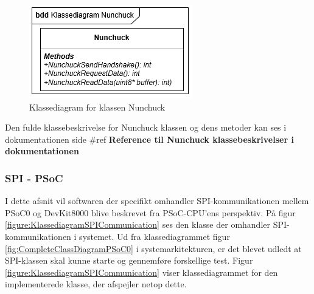 \begin{figure}[H]
	\centering
	\includegraphics[]{DesignOgImplementering/images/nunchuck}
	\caption{Klassediagram for klassen Nunchuck}
	\label{figure:NunchuckKlassediagram}
\end{figure}

Den fulde klassebeskrivelse for Nunchuck klassen og dens metoder kan ses i dokumentationen side \#ref \textbf{Reference til Nunchuck klassebeskrivelser i dokumentationen} 

\subsubsection{SPI - PSoC}
I dette afsnit vil softwaren der specifikt omhandler SPI-kommunikationen mellem PSoC0 og DevKit8000 blive beskrevet fra PSoC-CPU'ens perspektiv. På figur \ref{figure:KlassediagramSPICommunication} ses den klasse der omhandler SPI-kommunikationen i systemet. Ud fra klassediagrammet figur \ref{fig:CompleteClassDiagramPSoC0} i systemarkitekturen, er det blevet udledt at SPI-klassen skal kunne starte og gennemføre forskellige test. Figur \ref{figure:KlassediagramSPICommunication} viser klassediagrammet for den implementerede klasse, der afspejler netop dette.


